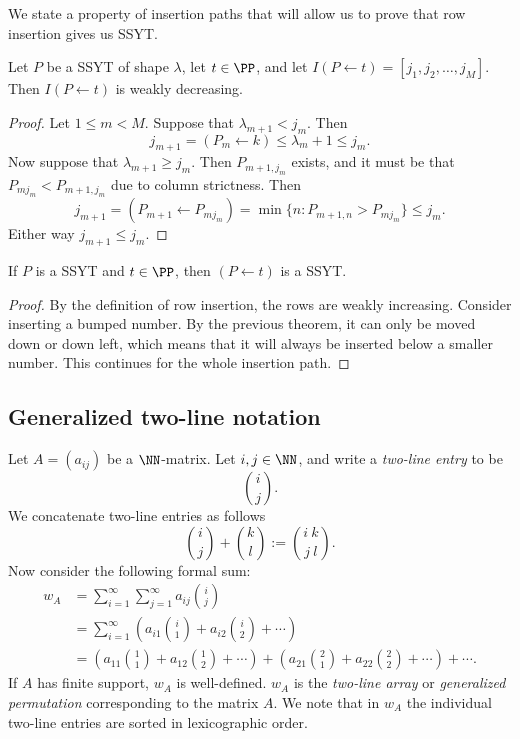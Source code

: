 \documentclass{article}
\begin{document}
We state a property of insertion paths that will allow us to prove that row insertion gives us SSYT.

\begin{theorem}
    Let $P$ be a SSYT of shape $\lambda$, let $t \in \PP$, and let $I(P\leftarrow t) = [j_1,j_2,\ldots,j_M]$. Then $I(P\leftarrow t)$ is weakly decreasing.
\end{theorem}

\begin{proof}
    Let $1 \leq m < M$.
    Suppose that $\lambda_{m+1} < j_m$. Then 
    \[
        j_{m+1} = (P_m \leftarrow k) \leq \lambda_m+1 \leq j_m.
    \]
    Now suppose that $\lambda_{m+1} \geq j_m$. 
    Then $P_{m+1,j_m}$ exists, and it must be that $P_{mj_m} < P_{m+1,j_m}$ due to column strictness. Then
    \[
        j_{m+1} = (P_{m+1} \leftarrow P_{mj_m}) = \min \{n:P_{m+1,n}>P_{mj_m}\} \leq j_m.
    \]
    Either way $j_{m+1} \leq j_m$.
\end{proof}

\begin{corollary}\label{InsertionPreservesSSYT}
    If $P$ is a SSYT and $t \in \PP$, then $(P \leftarrow t)$ is a SSYT.
\end{corollary}

\begin{proof}
    By the definition of row insertion, the rows are weakly increasing. Consider inserting a bumped number. By the previous theorem, it can only be moved down or down left, which means that it will always be inserted below a smaller number. This continues for the whole insertion path.
\end{proof}

\subsection{Generalized two-line notation}

\begin{definition}
    Let $A = (a_{ij})$ be a $\NN$-matrix. Let $i, j \in \NN$, and write a \textit{two-line entry} to be
    \[
        \binom{i}{j}.
    \]
    We concatenate two-line entries as follows
    \[
        \binom{i}{j} + \binom{k}{l} := \binom{i\:k}{j\:l}.
    \]
    Now consider the following formal sum:
    \begin{align*}
        w_A &= \sum_{i=1}^\infty \sum_{j=1}^\infty a_{ij}\binom{i}{j} \\
            &= \sum_{i=1}^\infty \left(a_{i1}\binom{i}{1} + a_{i2}\binom{i}{2} + \cdots\right) \\
            &= \left(a_{11}\binom{1}{1} + a_{12}\binom{1}{2} + \cdots\right) + \left(a_{21}\binom{2}{1} + a_{22}\binom{2}{2} + \cdots\right) + \cdots.
    \end{align*}
    If $A$ has finite support, $w_A$ is well-defined. 
    $w_A$ is the \textit{two-line array} or \textit{generalized permutation} corresponding to the matrix $A$. We note that in $w_A$ the individual two-line entries are sorted in lexicographic order.
\end{definition}
\end{document}
